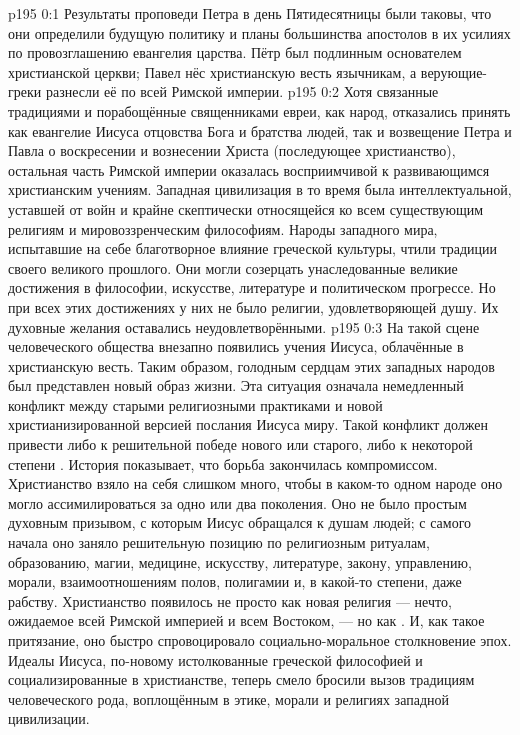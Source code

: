\author{Промежуточные создания}
\vs p195 0:1 Результаты проповеди Петра в день Пятидесятницы были таковы, что они определили будущую политику и планы большинства апостолов в их усилиях по провозглашению евангелия царства. Пётр был подлинным основателем христианской церкви; Павел нёс христианскую весть язычникам, а верующие\hyp{}греки разнесли её по всей Римской империи.
\vs p195 0:2 Хотя связанные традициями и порабощённые священниками евреи, как народ, отказались принять как евангелие Иисуса отцовства Бога и братства людей, так и возвещение Петра и Павла о воскресении и вознесении Христа (последующее христианство), остальная часть Римской империи оказалась восприимчивой к развивающимся христианским учениям. Западная цивилизация в то время была интеллектуальной, уставшей от войн и крайне скептически относящейся ко всем существующим религиям и мировоззренческим философиям. Народы западного мира, испытавшие на себе благотворное влияние греческой культуры, чтили традиции своего великого прошлого. Они могли созерцать унаследованные великие достижения в философии, искусстве, литературе и политическом прогрессе. Но при всех этих достижениях у них не было религии, удовлетворяющей душу. Их духовные желания оставались неудовлетворёнными.
\vs p195 0:3 На такой сцене человеческого общества внезапно появились учения Иисуса, облачённые в христианскую весть. Таким образом, голодным сердцам этих западных народов был представлен новый образ жизни. Эта ситуация означала немедленный конфликт между старыми религиозными практиками и новой христианизированной версией послания Иисуса миру. Такой конфликт должен привести либо к решительной победе нового или старого, либо к некоторой степени . История показывает, что борьба закончилась компромиссом. Христианство взяло на себя слишком много, чтобы в каком\hyp{}то одном народе оно могло ассимилироваться за одно или два поколения. Оно не было простым духовным призывом, с которым Иисус обращался к душам людей; с самого начала оно заняло решительную позицию по религиозным ритуалам, образованию, магии, медицине, искусству, литературе, закону, управлению, морали, взаимоотношениям полов, полигамии и, в какой\hyp{}то степени, даже рабству. Христианство появилось не просто как новая религия --- нечто, ожидаемое всей Римской империей и всем Востоком, --- но как . И, как такое притязание, оно быстро спровоцировало социально\hyp{}моральное столкновение эпох. Идеалы Иисуса, по\hyp{}новому истолкованные греческой философией и социализированные в христианстве, теперь смело бросили вызов традициям человеческого рода, воплощённым в этике, морали и религиях западной цивилизации.
